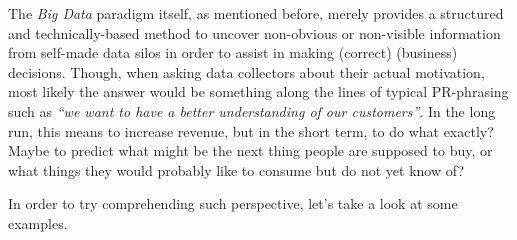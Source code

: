 \documentclass[12pt,english,a4paper,titlepage,cleardoublepage=empty,dottedtoc]{report}
\begin{document}
The \emph{Big Data} paradigm itself, as mentioned before, merely
provides a structured and technically-based method to uncover
non-obvious or non-visible information from self-made data silos in
order to assist in making (correct) (business) decisions. Though, when
asking data collectors about their actual motivation, most likely the
answer would be something along the lines of typical PR-phrasing such as
\emph{``we want to have a better understanding of our customers''}. In
the long run, this means to increase revenue, but in the short term, to
do what exactly? Maybe to predict what might be the next thing people
are supposed to buy, or what things they would probably like to consume
but do not yet know of?

In order to try comprehending such perspective, let's take a look at
some examples.
\end{document}

